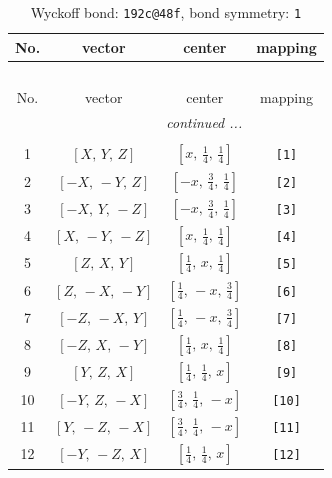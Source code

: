 \documentclass[fleqn,8pt]{jsarticle}
\begin{document}
\begin{longtable}{cccc}
\caption{Wyckoff bond: {\tt 192c@48f}, bond symmetry: {\tt 1}}
 \\
 \hline \hline
No. & vector & center & mapping \\ \hline \endfirsthead

\multicolumn{3}{l}{\tablename\ \thetable{}} \\
 \hline \hline
No. & vector & center & mapping \\ \hline \endhead

 \hline \hline
\multicolumn{3}{r}{\footnotesize\it continued ...} \\ \endfoot

 \hline \hline
\multicolumn{3}{r}{} \\ \endlastfoot

1 & $\left[ X,\, Y,\, Z \right]$ & $\left[ x,\, \frac{1}{4},\, \frac{1}{4} \right]$ & {\tt [1]} \\ \hline
2 & $\left[ - X,\, - Y,\, Z \right]$ & $\left[ - x,\, \frac{3}{4},\, \frac{1}{4} \right]$ & {\tt [2]} \\ \hline
3 & $\left[ - X,\, Y,\, - Z \right]$ & $\left[ - x,\, \frac{3}{4},\, \frac{1}{4} \right]$ & {\tt [3]} \\ \hline
4 & $\left[ X,\, - Y,\, - Z \right]$ & $\left[ x,\, \frac{1}{4},\, \frac{1}{4} \right]$ & {\tt [4]} \\ \hline
5 & $\left[ Z,\, X,\, Y \right]$ & $\left[ \frac{1}{4},\, x,\, \frac{1}{4} \right]$ & {\tt [5]} \\ \hline
6 & $\left[ Z,\, - X,\, - Y \right]$ & $\left[ \frac{1}{4},\, - x,\, \frac{3}{4} \right]$ & {\tt [6]} \\ \hline
7 & $\left[ - Z,\, - X,\, Y \right]$ & $\left[ \frac{1}{4},\, - x,\, \frac{3}{4} \right]$ & {\tt [7]} \\ \hline
8 & $\left[ - Z,\, X,\, - Y \right]$ & $\left[ \frac{1}{4},\, x,\, \frac{1}{4} \right]$ & {\tt [8]} \\ \hline
9 & $\left[ Y,\, Z,\, X \right]$ & $\left[ \frac{1}{4},\, \frac{1}{4},\, x \right]$ & {\tt [9]} \\ \hline
10 & $\left[ - Y,\, Z,\, - X \right]$ & $\left[ \frac{3}{4},\, \frac{1}{4},\, - x \right]$ & {\tt [10]} \\ \hline
11 & $\left[ Y,\, - Z,\, - X \right]$ & $\left[ \frac{3}{4},\, \frac{1}{4},\, - x \right]$ & {\tt [11]} \\ \hline
12 & $\left[ - Y,\, - Z,\, X \right]$ & $\left[ \frac{1}{4},\, \frac{1}{4},\, x \right]$ & {\tt [12]} \\ \hline

\end{longtable}
\end{document}
